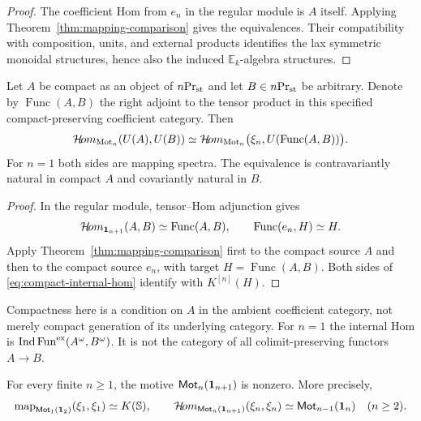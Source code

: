 \begin{proof}
The coefficient Hom from $e_n$ in the regular
module is $A$ itself. Applying
Theorem~\ref{thm:mapping-comparison} gives
the equivalences. Their compatibility with
composition, units, and external products
identifies the lax symmetric monoidal
structures, hence also the induced
$\mathbb E_k$-algebra structures.
\end{proof}



\begin{corollary}\label{cor:compact-internal-hom}
Let $A$ be compact as an object of ${n}\mathrm{Pr}_{\mathrm{st}}$ and let $B\in{n}\mathrm{Pr}_{\mathrm{st}}$
be arbitrary. Denote by $\operatorname{Func}(A,B)$ the right adjoint
to the tensor product in this specified compact-preserving
coefficient category. Then
\begin{equation}\label{eq:compact-internal-hom}
 \mathcal{H}\!om_{\operatorname{Mot}_n}(U(A),U(B))
 \simeq
 \mathcal{H}\!om_{\operatorname{Mot}_n}
       \bigl(\xi_n,U(\operatorname{Func}(A,B))\bigr).
\end{equation}
For $n=1$ both sides are mapping spectra.
The equivalence is contravariantly natural in compact $A$ and
covariantly natural in $B$.
\end{corollary}

\begin{proof}
In the regular module, tensor--Hom adjunction gives
\[
 \mathcal{H}\!om_{\mathbf 1_{n+1}}(A,B)\simeq\operatorname{Func}(A,B),
 \qquad
 \operatorname{Func}(e_n,H)\simeq H.
\]
Apply Theorem~\ref{thm:mapping-comparison} first to the compact source
$A$ and then to the compact source $e_n$, with target
$H=\operatorname{Func}(A,B)$.
Both sides of \eqref{eq:compact-internal-hom} identify with
$K^{[n]}(H)$.
\end{proof}

Compactness here is a condition on $A$ in the ambient coefficient
category, not merely compact generation of its underlying category.
For $n=1$ the internal Hom is
$\operatorname{Ind}\operatorname{Fun}^{\mathrm{ex}}(A^\omega,B^\omega)$.
It is not the category of all colimit-preserving functors
$A\to B$.

\begin{corollary}\label{cor:nonzero-all-heights}
For every finite $n\geq1$, the motive $\mathsf{Mot}_n(\mathbf 1_{n+1})$ is nonzero.
More precisely,
\[
 \operatorname{map}_{\mathsf{Mot}_1(\mathbf 1_2)}(\xi_1,\xi_1)\simeq K(\mathbb S),
 \qquad
 \mathcal{H}\!om_{\mathsf{Mot}_n(\mathbf 1_{n+1})}(\xi_n,\xi_n)
       \simeq\mathsf{Mot}_{n-1}(\mathbf 1_n)\quad(n\geq2).
\]
\end{corollary}




